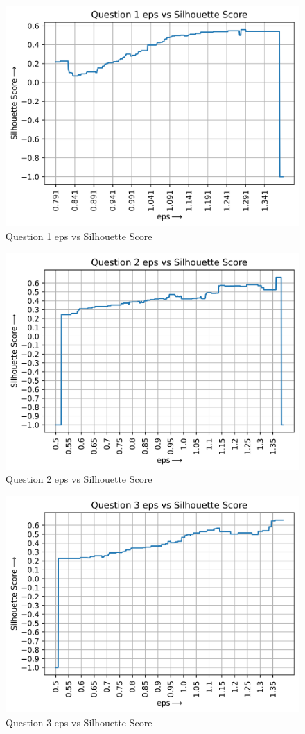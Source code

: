 \begin{figure}[H]
    \centering
    \includegraphics[width=0.75\linewidth]{IMAGE/eps&Silhouette.png}
    \caption{Question 1 eps vs Silhouette Score}
    \label{fig11}
\end{figure}

\begin{figure}[H]
    \centering
    \includegraphics[width=0.75\linewidth]{IMAGE/q2_eps&Silhouette.png}
    \caption{Question 2 eps vs Silhouette Score}
    \label{fig12}
\end{figure}

\begin{figure}[H]
    \centering
    \includegraphics[width=0.75\linewidth]{IMAGE/q3_eps&Silhouette.png}
    \caption{Question 3 eps vs Silhouette Score}
    \label{fig13}
\end{figure}

